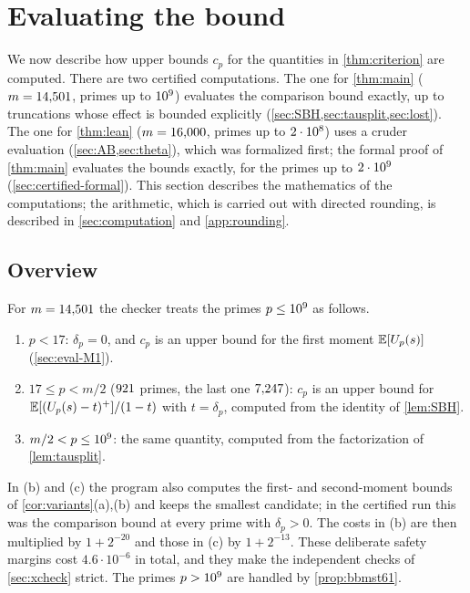 \section{Evaluating the bound}\label{sec:evaluation}

We now describe how upper bounds $c_p$ for the quantities in \cref{thm:criterion} are computed. There are two
certified computations. The one for \cref{thm:main} ($m=14{,}501$, primes up to $10^{9}$) evaluates the comparison
bound exactly, up to truncations whose effect is bounded explicitly (\cref{sec:SBH,sec:tausplit,sec:lost}). The one
for \cref{thm:lean} ($m=16{,}000$, primes up to $2\cdot 10^{8}$) uses a cruder evaluation (\cref{sec:AB,sec:theta}), which
was formalized first; the formal proof of \cref{thm:main} evaluates the bounds exactly, for the primes up to $2\cdot10^{9}$
(\cref{sec:certified-formal}). This section describes the mathematics of the computations; the arithmetic, which
is carried out with directed rounding, is described in \cref{sec:computation} and \cref{app:rounding}.

\subsection{Overview}\label{sec:eval-overview}

For $m=14{,}501$ the checker  treats the primes $p\le10^{9}$ as follows.
\begin{enumerate}[label=(\alph*)]
\item $p<17$: $\delta_p=0$, and $c_p$ is an upper bound for the first moment $\mathbb{E}[U_p(s)]$ (\cref{sec:eval-M1}).
\item $17\le p<m/2$ ($921$ primes, the last one $7{,}247$): $c_p$ is an upper bound for
  $\mathbb{E}[(U_p(s)-t)^+]/(1-t)$ with $t=\delta_p$, computed from the identity of \cref{lem:SBH}.
\item $m/2<p\le10^{9}$: the same quantity, computed from the factorization of \cref{lem:tausplit}.
\end{enumerate}
In (b) and (c) the program also computes the first- and second-moment bounds of \cref{cor:variants}(a),(b) and keeps
the smallest candidate; in the certified run this was the comparison bound at every prime with $\delta_p>0$. The costs
in (b) are then multiplied by $1+2^{-20}$ and those in (c) by $1+2^{-13}$. These deliberate safety margins cost
$4.6\cdot10^{-6}$ in total, and they make the independent checks of \cref{sec:xcheck} strict. The primes $p>10^{9}$
are handled by \cref{prop:bbmst61}.

